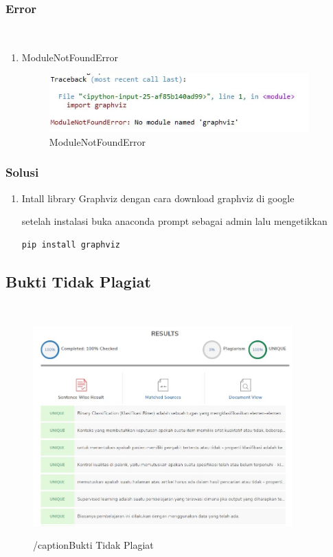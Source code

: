 \subsubsection{Error}
\hfill\\
\begin{enumerate}
\item ModuleNotFoundError

\begin{figure}[H]
\centerline{\includegraphics[width=10cm]{figures/1174057/chapter2/error1.jpg}}
\caption{ModuleNotFoundError}
\label{labelgambar}
\end{figure}
\end{enumerate}

\subsubsection{Solusi}
\begin{enumerate}
\item Intall library Graphviz dengan cara download graphviz di google

setelah instalasi buka anaconda prompt sebagai admin lalu mengetikkan
\begin{lstlisting}
pip install graphviz
\end{lstlisting} 
\end{enumerate}

\subsection{Bukti Tidak Plagiat}
\hfill\\
\begin{figure}[H]
\centerline{\includegraphics[width=10cm]{figures/1174057/chapter2/plagiat.jpg}}
/caption{Bukti Tidak Plagiat}
\label{labelgambar}
\end{figure}

